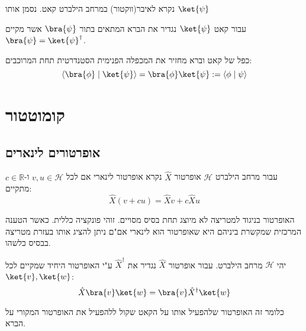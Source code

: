 \documentclass{tstextbook}
\begin{document}
\begin{definition}[קאט]
נקרא לאיבר(ווקטור) במרחב הילברט קאט. נסמן אותו \(\ket{\psi}\)

\end{definition}
\begin{definition}[ברא]
עבור קאט \(\ket{\psi}\) נגדיר את הברא המתאים בתור \(\bra{\psi}\) אשר מקיים \(\bra{\psi}=\ket{\psi}^{\dagger}\).

\end{definition}
\begin{proposition}
כפל של קאט וברא מחזיר את המכפלה הפנימית הסטנדרטית תחת המרוכבים:
$$\left\langle  \bra{\phi} \mid \ket{\psi}   \right\rangle =\bra{\phi}\ket{\psi} :=\left\langle  \phi \mid \psi  \right\rangle  $$

\end{proposition}
\section{קומוטטור}

\subsection{אופרטורים לינארים}

\begin{definition}
עבור מרחב הילברט \(\mathcal{H}\) אופרטור \(\hat{X}\) נקרא אופרטור לינארי אם לכל \(v,u \in \mathcal{H}\) ו-\(c \in \mathbb{R}\) מתקיים:
$$\hat{X}(v+cu)=\hat{X}v+c\hat{X}u$$

\end{definition}
האופרטור בניגוד למטריצה לא מיוצג תחת בסיס מסויים. זוהי פונקציה כללית. כאשר הטענה המרכזית שמקשרת ביניהם היא שאופרטור הוא לינארי אם"ם ניתן להציג אותו בעזרת מטריצה בבסיס כלשהו.

\begin{definition}
יהי \(\mathcal{H}\) מרחב הילברט. עבור אופרטור \(\hat{X}\) נגדיר את \(\hat{X}^{\dagger}\) ע"י האופרטור היחיד שמקיים לכל \(\ket{v},\ket{w}\):
$$\hat{X}\bra{v} \ket{w} =\bra{v} \hat{X}^{\dagger}\ket{w} $$

\end{definition}
כלומר זה האופרטור שלהפעיל אותו  על הקאט שקול ללהפעיל את האופרטור המקורי על הברא.
\end{document}
